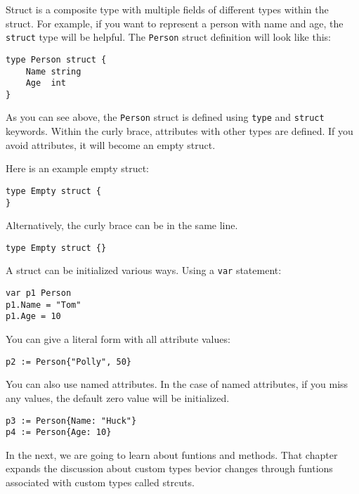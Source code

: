 Struct is a composite type with multiple fields of
different types within the struct.  For example, if you want to
represent a person with name and age, the \texttt{struct} type will be
helpful.  The \texttt{Person} struct definition will look like this:

\begin{lstlisting}[numbers=none]
type Person struct {
    Name string
    Age  int
}
\end{lstlisting}

As you can see above, the \texttt{Person} struct is defined
using \texttt{type} and \texttt{struct} keywords.  Within the curly
brace, attributes with other types are defined.  If you avoid
attributes, it will become an empty struct.

Here is an example empty struct:

\begin{lstlisting}[numbers=none]
type Empty struct {
}
\end{lstlisting}

Alternatively, the curly brace can be in the same line.

\begin{lstlisting}[numbers=none]
type Empty struct {}
\end{lstlisting}

A struct can be initialized various ways.  Using a \texttt{var}
statement:

\begin{lstlisting}[numbers=none]
var p1 Person
p1.Name = "Tom"
p1.Age = 10
\end{lstlisting}

You can give a literal form with all attribute values:

\begin{lstlisting}[numbers=none]
p2 := Person{"Polly", 50}
\end{lstlisting}

You can also use named attributes.  In the case of named attributes,
if you miss any values, the default zero value will be initialized.

\begin{lstlisting}[numbers=none]
p3 := Person{Name: "Huck"}
p4 := Person{Age: 10}
\end{lstlisting}

In the next, we are going to learn about funtions and methods.  That
chapter expands the discussion about custom types bevior changes
through funtions associated with custom types called strcuts.

